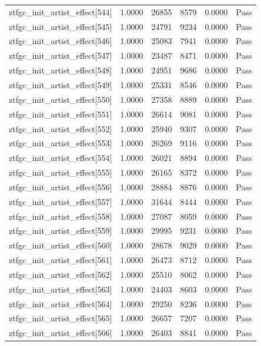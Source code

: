\begin{table}[htbp]
\begin{tabular}{llrrll}
ztfgc\_init\_artist\_effect[544] & 1.0000 & 26855 & 8579 & 0.0000 & Pass \\
ztfgc\_init\_artist\_effect[545] & 1.0000 & 24791 & 9234 & 0.0000 & Pass \\
ztfgc\_init\_artist\_effect[546] & 1.0000 & 25083 & 7941 & 0.0000 & Pass \\
ztfgc\_init\_artist\_effect[547] & 1.0000 & 23487 & 8471 & 0.0000 & Pass \\
ztfgc\_init\_artist\_effect[548] & 1.0000 & 24951 & 9686 & 0.0000 & Pass \\
ztfgc\_init\_artist\_effect[549] & 1.0000 & 25331 & 8546 & 0.0000 & Pass \\
ztfgc\_init\_artist\_effect[550] & 1.0000 & 27358 & 8889 & 0.0000 & Pass \\
ztfgc\_init\_artist\_effect[551] & 1.0000 & 26614 & 9081 & 0.0000 & Pass \\
ztfgc\_init\_artist\_effect[552] & 1.0000 & 25940 & 9307 & 0.0000 & Pass \\
ztfgc\_init\_artist\_effect[553] & 1.0000 & 26269 & 9116 & 0.0000 & Pass \\
ztfgc\_init\_artist\_effect[554] & 1.0000 & 26021 & 8894 & 0.0000 & Pass \\
ztfgc\_init\_artist\_effect[555] & 1.0000 & 26165 & 8372 & 0.0000 & Pass \\
ztfgc\_init\_artist\_effect[556] & 1.0000 & 28884 & 8876 & 0.0000 & Pass \\
ztfgc\_init\_artist\_effect[557] & 1.0000 & 31644 & 8444 & 0.0000 & Pass \\
ztfgc\_init\_artist\_effect[558] & 1.0000 & 27087 & 8059 & 0.0000 & Pass \\
ztfgc\_init\_artist\_effect[559] & 1.0000 & 29995 & 9231 & 0.0000 & Pass \\
ztfgc\_init\_artist\_effect[560] & 1.0000 & 28678 & 9029 & 0.0000 & Pass \\
ztfgc\_init\_artist\_effect[561] & 1.0000 & 26473 & 8712 & 0.0000 & Pass \\
ztfgc\_init\_artist\_effect[562] & 1.0000 & 25510 & 8062 & 0.0000 & Pass \\
ztfgc\_init\_artist\_effect[563] & 1.0000 & 24403 & 8603 & 0.0000 & Pass \\
ztfgc\_init\_artist\_effect[564] & 1.0000 & 29250 & 8236 & 0.0000 & Pass \\
ztfgc\_init\_artist\_effect[565] & 1.0000 & 26657 & 7207 & 0.0000 & Pass \\
ztfgc\_init\_artist\_effect[566] & 1.0000 & 26403 & 8841 & 0.0000 & Pass \\

\end{tabular}
\end{table}
